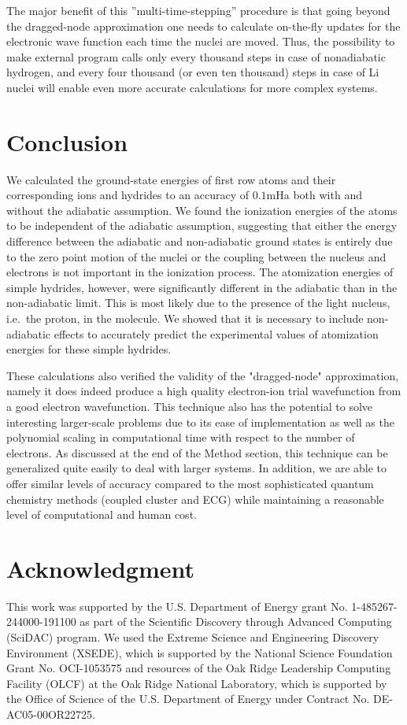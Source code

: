 \documentclass[pra,superscriptaddress,groupedaddress,twocolumn]{revtex4}
\begin{document}
The major benefit of this ''multi-time-stepping'' procedure is that going beyond the dragged-node approximation one needs to calculate on-the-fly updates for the electronic wave function each time the nuclei are moved. Thus, the possibility to make external program calls only every thousand steps in case of nonadiabatic hydrogen, and every four thousand (or even ten thousand) steps in case of Li nuclei will enable even more accurate calculations for more complex systems.


\section{Conclusion}
We calculated the ground-state energies of first row atoms and their corresponding ions and hydrides to an accuracy of $0.1$mHa both with and without the adiabatic assumption. We found the ionization energies of the atoms to be independent of the adiabatic assumption, suggesting that either the energy difference between the adiabatic and non-adiabatic ground states is entirely due to the zero point motion of the nuclei or the coupling between the nucleus and electrons is not important in the ionization process. The atomization energies of simple hydrides, however, were significantly different in the adiabatic than in the non-adiabatic limit.  This is most likely due to the presence of the light nucleus, i.e.~the proton, in the molecule. We showed that it is necessary to include non-adiabatic effects to accurately predict the experimental values of atomization energies for these simple hydrides.

These calculations also verified the validity of the "dragged-node" approximation, namely it does indeed produce a high quality electron-ion trial wavefunction from a good electron wavefunction. This technique also has the potential to solve interesting larger-scale problems due to its ease of implementation as well as the polynomial scaling in computational time with respect to the number of electrons. As discussed at the end of the Method section, this technique can be generalized quite easily to deal with larger systems. In addition, we are able to offer similar levels of accuracy compared to the most sophisticated quantum chemistry methods (coupled cluster and ECG) while maintaining a reasonable level of computational and human cost.

\section{Acknowledgment}
This work was supported by the U.S. Department of Energy grant No. 1-485267-244000-191100 as part of the Scientific Discovery through Advanced Computing (SciDAC) program. We used the Extreme Science and Engineering Discovery Environment (XSEDE), which is supported by the National Science Foundation Grant No. OCI-1053575 and resources of the Oak Ridge Leadership Computing Facility (OLCF) at the Oak Ridge National Laboratory, which is supported by the Office of Science of the U.S. Department of Energy under Contract No. DE-AC05-00OR22725.



\end{document}
